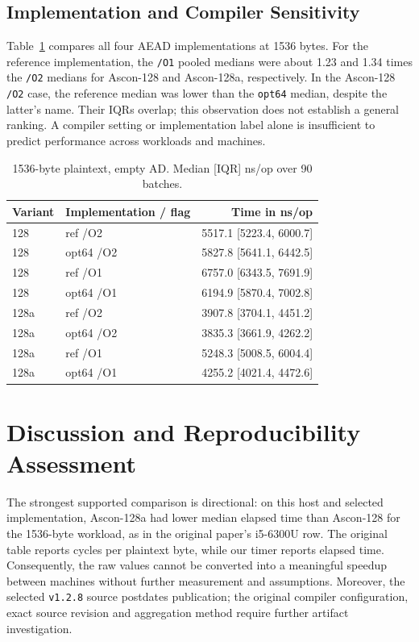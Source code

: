 \documentclass[conference]{IEEEtran}
\begin{document}
\subsection{Implementation and Compiler Sensitivity}
Table~\ref{tab:flags} compares all four AEAD implementations at 1536 bytes.
For the reference implementation, the \texttt{/O1} pooled medians were about
1.23 and 1.34 times the \texttt{/O2} medians for Ascon-128 and Ascon-128a,
respectively. In the Ascon-128 \texttt{/O2} case, the reference median was
lower than the \texttt{opt64} median, despite the latter's name. Their IQRs
overlap; this observation does not establish a general ranking. A compiler
setting or implementation label alone is insufficient to predict performance
across workloads and machines.

\begin{table}[htbp]
\caption{1536-byte plaintext, empty AD. Median [IQR] ns/op over 90 batches.}
\label{tab:flags}
\centering
\begin{tabular}{llr}
\hline
Variant & Implementation / flag & Time in ns/op \\
\hline
128  & ref /O2   & 5517.1 [5223.4, 6000.7] \\
128  & opt64 /O2 & 5827.8 [5641.1, 6442.5] \\
128  & ref /O1   & 6757.0 [6343.5, 7691.9] \\
128  & opt64 /O1 & 6194.9 [5870.4, 7002.8] \\
128a & ref /O2   & 3907.8 [3704.1, 4451.2] \\
128a & opt64 /O2 & 3835.3 [3661.9, 4262.2] \\
128a & ref /O1   & 5248.3 [5008.5, 6004.4] \\
128a & opt64 /O1 & 4255.2 [4021.4, 4472.6] \\
\hline
\end{tabular}
\end{table}

\section{Discussion and Reproducibility Assessment}
The strongest supported comparison is directional: on this host and selected
implementation, Ascon-128a had lower median elapsed time than Ascon-128 for
the 1536-byte workload, as in the original paper's i5-6300U row. The original
table reports cycles per plaintext byte, while our timer reports elapsed
time. Consequently, the raw values cannot be converted into a meaningful
speedup between machines without further measurement and assumptions.
Moreover, the selected \texttt{v1.2.8} source postdates publication; the
original compiler configuration, exact source revision and aggregation
method require further artifact investigation.
\end{document}
